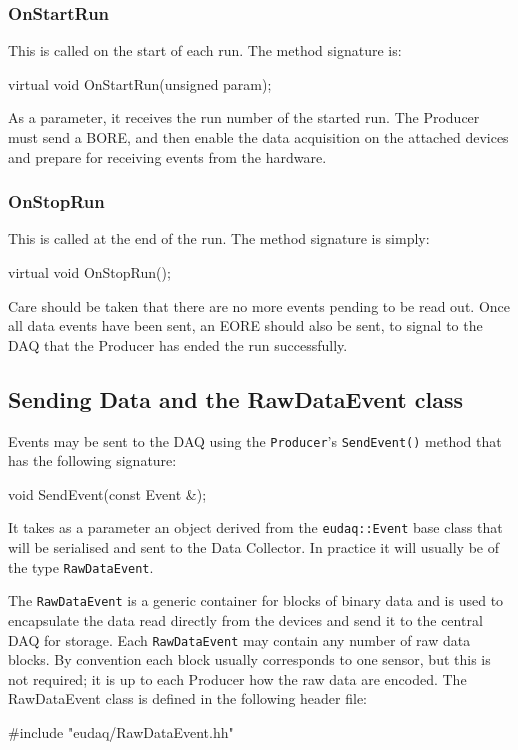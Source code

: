 \subsubsection{OnStartRun}
This is called on the start of each run.
The method signature is:
\begin{listing}
virtual void OnStartRun(unsigned param);
\end{listing}

As a parameter, it receives the run number of the started run.
The Producer must send a \gls{BORE},
and then enable the data acquisition on the attached devices and prepare for receiving events from the hardware.


\subsubsection{OnStopRun}
This is called at the end of the run.
The method signature is simply:
\begin{listing}
virtual void OnStopRun();
\end{listing}

Care should be taken that there are no more events pending to be read out.
Once all data events have been sent, an \gls{EORE} should also be sent,
to signal to the DAQ that the Producer has ended the run successfully.

\subsection{Sending Data and the RawDataEvent class}
Events may be sent to the DAQ using the \texttt{Producer}'s \texttt{SendEvent()} method
that has the following signature:
\begin{listing}
void SendEvent(const Event &);
\end{listing}

It takes as a parameter an object derived from the \texttt{eudaq::Event} base class
that will be serialised and sent to the Data Collector.
In practice it will usually be of the type \texttt{RawDataEvent}.

The \texttt{RawDataEvent} is a generic container for blocks of binary data and is used to encapsulate the data read directly from the devices and send it to the central DAQ for storage.
Each \texttt{RawDataEvent} may contain any number of raw data blocks.
By convention each block usually corresponds to one sensor,
but this is not required;
it is up to each Producer how the raw data are encoded.
The RawDataEvent class is defined in the following header file:
\begin{listing}
#include "eudaq/RawDataEvent.hh"
\end{listing}

